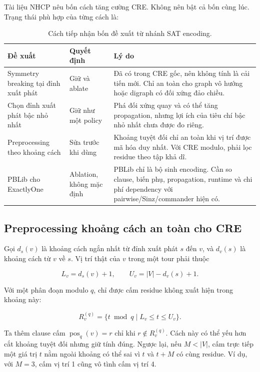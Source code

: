 \documentclass[11pt,a4paper,oneside]{scrreprt}
\begin{document}
Tài liệu NHCP nêu bốn cách tăng cường CRE. Không nên bật cả bốn cùng lúc. Trạng thái phù hợp của từng cách là:

\begin{table}[H]
\centering
\small
\begin{tabularx}{\textwidth}{p{31mm} p{30mm} X}
\toprule
Đề xuất & Quyết định & Lý do \\
\midrule
Symmetry breaking tại đỉnh xuất phát & Giữ và ablate & Đã có trong CRE gốc, nên không tính là cải tiến mới. Chỉ an toàn cho graph vô hướng hoặc digraph có đối xứng đảo chiều. \\
Chọn đỉnh xuất phát bậc nhỏ nhất & Giữ như một policy & Phá đối xứng quay và có thể tăng propagation, nhưng lợi ích của tiêu chí bậc nhỏ nhất chưa được đo riêng. \\
Preprocessing theo khoảng cách & Sửa trước khi dùng & Khoảng tuyệt đối chỉ an toàn khi vị trí được mã hóa duy nhất. Với CRE modulo, phải lọc residue theo tập khả dĩ. \\
PBLib cho ExactlyOne & Ablation, không mặc định & PBLib chỉ là bộ sinh encoding. Cần so clause, biến phụ, propagation, runtime và chi phí dependency với pairwise/Sinz/commander hiện có. \\
\bottomrule
\end{tabularx}
\caption{Cách tiếp nhận bốn đề xuất từ nhánh SAT encoding.}
\end{table}

\subsection{Preprocessing khoảng cách an toàn cho CRE}

Gọi $d_s(v)$ là khoảng cách ngắn nhất từ đỉnh xuất phát $s$ đến $v$, và $d_v(s)$ là khoảng cách từ $v$ về $s$. Vị trí thật của $v$ trong một tour phải thuộc

\[
  L_v=d_s(v)+1,
  \qquad
  U_v=|V|-d_v(s)+1.
\]

Với một phân đoạn modulo $q$, chỉ được cấm residue không xuất hiện trong khoảng này:

\[
  R_v^{(q)}=\{t\bmod q\mid L_v\leq t\leq U_v\}.
\]

Ta thêm clause cấm $\operatorname{pos}_q(v)=r$ chỉ khi $r\notin R_v^{(q)}$. Cách này có thể yếu hơn cắt khoảng tuyệt đối nhưng giữ tính đúng. Ngược lại, nếu $M<|V|$, cấm trực tiếp một giá trị $t$ nằm ngoài khoảng có thể sai vì $t$ và $t+M$ có cùng residue. Ví dụ, với $M=3$, cấm vị trí 1 cũng vô tình cấm vị trí 4.
\end{document}
